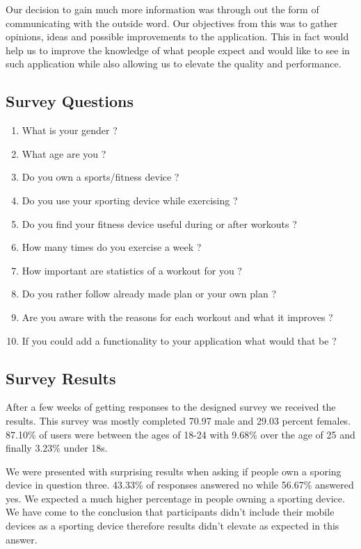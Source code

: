 \documentclass[a4paper,12pt,twoside]{report}
\begin{document}
Our decision to gain much more information was through out the form of communicating with the outside word. Our objectives from this was to gather opinions, ideas and possible improvements to the application.
This in fact would help us to improve the knowledge of what people expect and would like to see in such application while also allowing us to elevate the quality and performance.\cite{surveyReasearch}

\subsection{Survey Questions}

\begin{enumerate}
    \item What is your gender ?
    \item What age are you ? 
    \item Do you own a sports/fitness device ?
    \item Do you use your sporting device while exercising ?
    \item Do you find your fitness device useful during or after workouts ?
    \item How many times do you exercise a week ?
    \item How important are statistics of a workout for you ?
    \item Do you rather follow already made plan or your own plan ?
    \item Are you aware with the reasons for each workout and what it improves ?
    \item If you could add a functionality to your application what would that be ?
\end{enumerate}

\subsection{Survey Results}

After a few weeks of getting responses to the designed survey we received the results.
This survey was mostly completed 70.97 male and 29.03 percent females.
87.10\% of users were between the ages of 18-24 with 9.68\% over the age of 25 and finally 3.23\% under 18s.

We were presented with surprising results when asking if people own a sporing device in question three.
43.33\% of responses answered no while 56.67\% answered yes. We expected a much higher percentage in people owning a sporting device. We have come to the conclusion that participants didn't include their mobile devices as a sporting device therefore results didn't elevate as expected in this answer.\\ 
\end{document}
